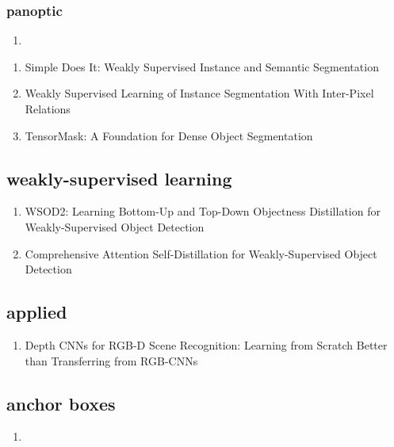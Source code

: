 \documentclass[acmlarge]{acmart}
\begin{document}
		\subsubsection{panoptic}
		\begin{enumerate}
			\item
		\end{enumerate}
	\begin{enumerate}
		\item Simple Does It: Weakly Supervised Instance and Semantic Segmentation \cite{Khoreva2017SimpleDI} 

		\item Weakly Supervised Learning of Instance Segmentation With Inter-Pixel Relations \cite{Ahn2019WeaklySL} 

		\item TensorMask: A Foundation for Dense Object Segmentation \cite{Chen2019TensorMaskAF} 

	\end{enumerate}
	\subsection{weakly-supervised learning}
	\begin{enumerate}
		\item WSOD2: Learning Bottom-Up and Top-Down Objectness Distillation for Weakly-Supervised Object Detection \cite{Zeng2019WSOD2LB} 

		\item Comprehensive Attention Self-Distillation for Weakly-Supervised Object Detection \cite{Huang2020ComprehensiveAS} 

	\end{enumerate}
	\subsection{applied}
	\begin{enumerate}
		\item Depth CNNs for RGB-D Scene Recognition: Learning from Scratch Better than Transferring from RGB-CNNs \cite{Song2017DepthCF} 

	\end{enumerate}
	\subsection{anchor boxes}
	\begin{enumerate}
		\item
	\end{enumerate}
\end{document}
